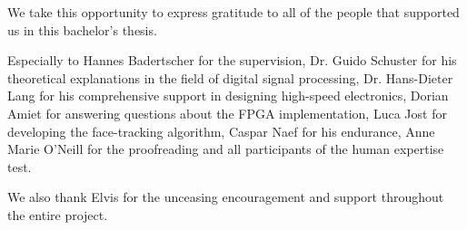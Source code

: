 \begin{acknowledgement}
We take this opportunity to express gratitude to all of the people that supported us in this bachelor's thesis.

Especially to Hannes Badertscher for the supervision, Dr. Guido Schuster for his theoretical explanations in the field of digital signal processing, Dr. Hans-Dieter Lang for his comprehensive support in designing high-speed electronics, Dorian Amiet for answering questions about the FPGA implementation, Luca Jost for developing the face-tracking algorithm, Caspar Naef for his endurance, Anne Marie O'Neill for the proofreading and all participants of the human expertise test.

We also thank Elvis for the unceasing encouragement and support throughout the entire project.
\end{acknowledgement}